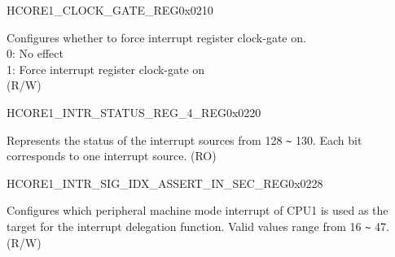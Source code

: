 \begin{register}{H}{CORE1\_CLOCK\_GATE\_REG}{0x0210}\label{regdesc:CORE1CLOCKGATEREG}
%
%
\regnewline%
\begin{regdesc}\begin{reglist}
\label{fielddesc:CORE1REGCLKEN}\item [CORE1\_REG\_CLK\_EN] Configures whether to force interrupt register clock-gate on.\\
0: No effect \\
1: Force interrupt register clock-gate on \\
(R/W)
\end{reglist}\end{regdesc}
\end{register}

\begin{register}{H}{CORE1\_INTR\_STATUS\_REG\_4\_REG}{0x0220}\label{regdesc:CORE1INTRSTATUSREG4REG}
%
\regnewline%
\begin{regdesc}\begin{reglist}
\label{fielddesc:CORE1INTRSTATUS4}\item [CORE1\_INTR\_STATUS\_4] Represents the status of the interrupt sources from 128 \verb+~+ 130. Each bit corresponds to one interrupt source. (RO)
\end{reglist}\end{regdesc}
\end{register}

\begin{register}{H}{CORE1\_INTR\_SIG\_IDX\_ASSERT\_IN\_SEC\_REG}{0x0228}\label{regdesc:CORE1INTRSIGIDXASSERTINSECREG}
%
%
\regnewline%
\begin{regdesc}\begin{reglist}
\label{fielddesc:CORE1INTRSIGIDXASSERTINSEC}\item [CORE1\_INTR\_SIG\_IDX\_ASSERT\_IN\_SEC] Configures which peripheral machine mode interrupt of CPU1 is used as the target for the interrupt delegation function. Valid values range from 16 \verb+~+ 47. (R/W)
\end{reglist}\end{regdesc}
\end{register}

